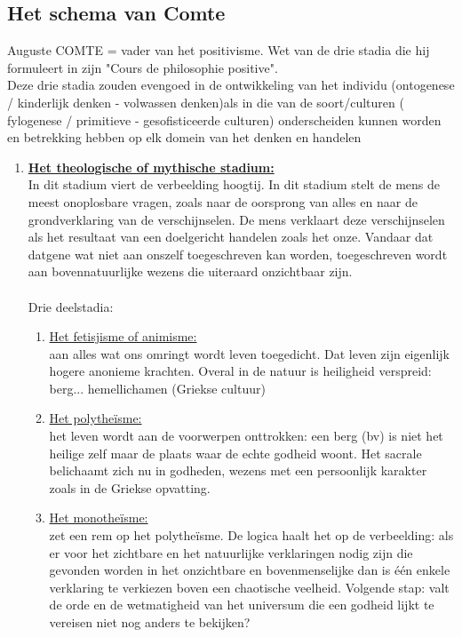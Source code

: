 \documentclass[11pt,a4paper]{article}
\begin{document}
\subsection{Het schema van Comte}
Auguste COMTE = vader van het positivisme. Wet van de drie stadia die hij formuleert in zijn "Cours de philosophie positive".\\
Deze drie stadia zouden evengoed in de ontwikkeling van het individu (ontogenese / kinderlijk denken - volwassen denken)als in die van de soort/culturen ( fylogenese / primitieve - gesofisticeerde culturen) onderscheiden kunnen worden en betrekking hebben op elk domein van het denken en handelen
\begin{enumerate}
\item \underline{\textbf{Het theologische of mythische stadium:}}
\\
In dit stadium viert de verbeelding hoogtij.
In dit stadium stelt de mens de meest onoplosbare vragen, zoals naar de oorsprong van alles en naar de grondverklaring van de verschijnselen. De mens verklaart deze verschijnselen als het resultaat van een doelgericht handelen zoals het onze. Vandaar dat datgene wat niet aan onszelf toegeschreven kan worden, toegeschreven wordt aan bovennatuurlijke wezens die uiteraard onzichtbaar zijn.
\\
\\
Drie deelstadia:
\begin{enumerate}
\item \underline{Het fetisjisme of animisme:}\\
aan alles wat ons omringt wordt leven toegedicht. Dat leven zijn eigenlijk hogere anonieme krachten. Overal in de natuur is heiligheid verspreid: berg... hemellichamen (Griekse cultuur)
\item \underline{Het polythe\"isme:} \\
het leven wordt aan de voorwerpen onttrokken: een berg (bv) is niet het heilige zelf maar de plaats waar de echte godheid woont. Het sacrale belichaamt zich nu in godheden, wezens met een persoonlijk karakter zoals in de Griekse opvatting.
\item \underline{Het monothe\"isme:}\\
 zet een rem op het polythe\"isme. De logica haalt het op de verbeelding: als er voor het zichtbare en het natuurlijke verklaringen nodig zijn die gevonden worden in het onzichtbare en bovenmenselijke dan is \'e\'en enkele verklaring te verkiezen boven een chaotische veelheid.
Volgende stap: valt de orde en de wetmatigheid van het universum die een godheid lijkt te vereisen niet nog anders te bekijken?

\end{enumerate}
\end{enumerate}
\end{document}
